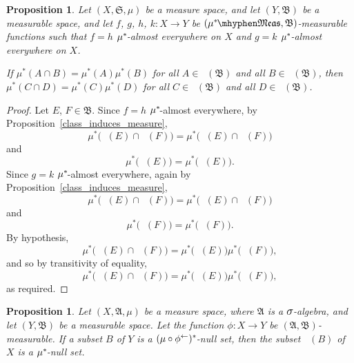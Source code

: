 \documentclass[
twoside=true,
paper=letter,
fontsize=9pt,
pagesize=auto,
leqno,
openany,
headsepline,
overfullrule,
]{scrbook}
\theoremstyle{plain}
\theoremstyle{plain}
\newtheorem{prop}[thm]{Proposition}
\theoremstyle{definition}
\theoremstyle{bfnoteitalic}
\theoremstyle{bfnoteroman}
\newcommand{\sigalg}[1]{\mathfrak{#1}}
\newcommand{\textsigma}{\hbox{\large{$\sigma$}}\kern-1pt}
\newcommand{\preimage}[1]{\mathop{#1^{\leftarrow}}}
\newcommand{\meets}{\cap}
\newcommand{\semiring}{\sigalg{S}}
\newcommand{\sigmaalgebra}{\sigalg{A}}
\newcommand{\sigmaalgebraii}{\sigalg{B}}
\newcommand{\measurable}[1]{{#1}\mhyphen\mathfrak{Meas}}
\newcommand{\kernast}{\ast\kern-1pt}
\newcommand{\measurespace}{X}
\newcommand{\measurespaceii}{Y}
\newcommand{\measure}{\mu}
\begin{document}
\begin{prop}\label{class_induced_measure}
Let $(\measurespace,\semiring,\measure)$ be a measure space, and let $(\measurespaceii, \sigmaalgebraii)$ be a measurable space, and let
$f$, $g$, $h$, $k:\measurespace\to\measurespaceii$ 
be $(\measurable{\measure^\kernast}, \sigmaalgebraii)$\hyp{}measurable functions such that 
$f = h$ $\measure^\kernast$-almost everywhere on $\measurespace$ and
$g = k$ $\measure^\kernast$-almost everywhere on $\measurespace$.

If $\measure^*(A\meets B) =\measure^*(A)\measure^*(B)$ for all $A\in\preimage{f}(\sigmaalgebraii)$ and 
all $B\in\preimage{g}(\sigmaalgebraii)$, then
$\measure^*(C\meets D) =\measure^*(C)\measure^*(D)$ for all $C\in\preimage{h}(\sigmaalgebraii)$ and 
all $D\in\preimage{k}(\sigmaalgebraii)$.
\end{prop}

\begin{proof}
Let $E$, $F\in\sigmaalgebraii$.
Since $f=h$ $\measure^\kernast$-almost everywhere, 
by Proposition~\ref{class_induces_measure},
\[
\measure^*\bigl(\preimage{f}(E)\meets\preimage{k}(F)\bigr) 
= 
\measure^*\bigl(\preimage{h}(E)\meets\preimage{k}(F)\bigr)
\]
and
\[
\measure^*\bigl(\preimage{f}(E)\bigr) 
= 
\measure^*\bigl(\preimage{h}(E)\bigr).
\]
Since $g=k$ $\measure^\kernast$-almost everywhere, again
by Proposition~\ref{class_induces_measure},
\[
\measure^*\bigl(\preimage{f}(E)\meets\preimage{k}(F)\bigr) 
= 
\measure^*\bigl(\preimage{f}(E)\meets\preimage{g}(F)\bigr)
\]
and
\[
\measure^*\bigl(\preimage{k}(F)\bigr) 
= 
\measure^*\bigl(\preimage{g}(F)\bigr).
\]
By hypothesis,
\[
\measure^*\bigl(\preimage{f}(E)\meets\preimage{g}(F)\bigr)
=
\measure^*\bigl(\preimage{f}(E)\bigr)\measure^*\bigl(\preimage{g}(F)\bigr),
\]
and so by transitivity of equality,
\[
\measure^*\bigl(\preimage{h}(E)\meets\preimage{k}(F)\bigr)
=
\measure^*\bigl(\preimage{h}(E)\bigr)\measure^*\bigl(\preimage{k}(F)\bigr),
\]
as required.
\end{proof}


\begin{prop}\label{preimage_of_a_null_set}
Let $(\measurespace,\sigmaalgebra,\measure)$ be a measure space, where $\sigmaalgebra$ is a $\textsigma$-algebra, and let $(\measurespaceii, \sigmaalgebraii)$ be a measurable space.  Let the function $\phi:\measurespace\to\measurespaceii$ be $(\sigmaalgebra, \sigmaalgebraii)$\hyp{}measurable.
If a subset $B$ of $\measurespaceii$ is a $(\measure\circ\preimage{\phi})^\kernast$-null set, then  the subset $\preimage{\phi}(B)$ of $\measurespace$ is a $\measure^\kernast$-null set.
\end{prop}
\end{document}
